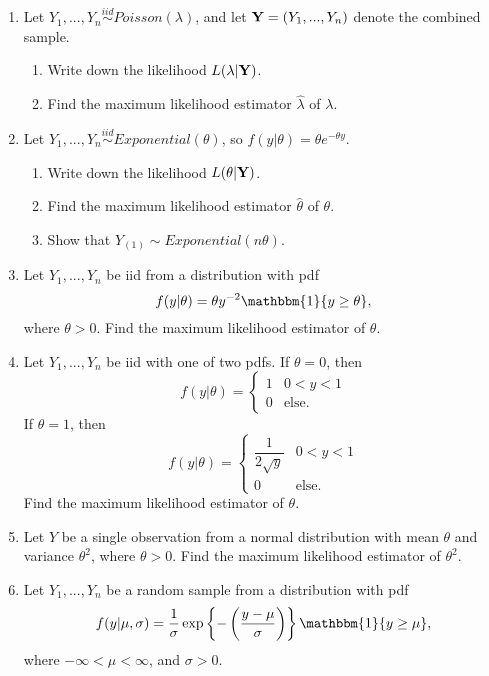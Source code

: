 \documentclass[11pt]{article}
\begin{document}
\begin{enumerate}
\item Let $Y_1,...,Y_n \overset{iid}{\sim} Poisson(\lambda)$, and let ${\bf Y} = (Y_1,...,Y_n)$ denote the combined sample.

\begin{enumerate}
\item Write down the likelihood $L(\lambda |{\bf Y} )$.

\item Find the maximum likelihood estimator $\widehat{\lambda}$ of $\lambda$.
\end{enumerate}

\item Let $Y_1,...,Y_n \overset{iid}{\sim} Exponential(\theta)$, so $f(y | \theta) = \theta e^{-\theta y}$.

\begin{enumerate}
\item Write down the likelihood $L(\theta | {\bf Y})$.

\item Find the maximum likelihood estimator $\widehat{\theta}$ of $\theta$.

\item Show that $Y_{(1)} \sim Exponential(n \theta)$.
\end{enumerate}

\item Let $Y_1,...,Y_n$ be iid from a distribution with pdf
$$f(y|\theta) = \theta y^{-2} \mathbbm{1}\{y \geq \theta \},$$
where $\theta > 0$. Find the maximum likelihood estimator of $\theta$.

\item Let $Y_1,...,Y_n$ be iid with one of two pdfs. If $\theta = 0$, then
$$f(y | \theta) = \begin{cases}
1 & 0 < y < 1 \\
0 & \text{else}.
\end{cases}$$
If $\theta = 1$, then
$$f(y | \theta) = \begin{cases}
\dfrac{1}{2 \sqrt{y}} & 0 < y < 1 \\
0 & \text{else}.
\end{cases}$$
Find the maximum likelihood estimator of $\theta$.

\item Let $Y$ be a single observation from a normal distribution with mean $\theta$ and variance $\theta^2$, where $\theta > 0$. Find the maximum likelihood estimator of $\theta^2$.

\item Let $Y_1,...,Y_n$ be a random sample from a distribution with pdf
$$f(y | \mu, \sigma) = \frac{1}{\sigma} \exp \left \lbrace - \left( \dfrac{y - \mu}{\sigma} \right) \right \rbrace \mathbbm{1}\{y \geq \mu \},$$
where $-\infty < \mu < \infty$, and $\sigma > 0$.


\end{enumerate}
\end{document}
